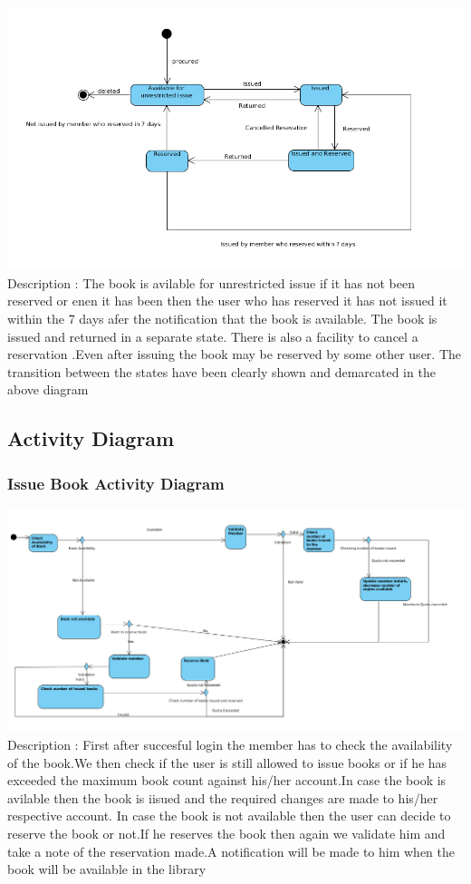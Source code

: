 \documentclass[a4paper]{article}
\begin{document}
\includegraphics[scale=0.50]{images/stateDiagIssue.png}
\\
Description : The book is avilable for unrestricted issue if it has not been reserved or enen it has been then the user who has reserved it has not issued it within the 7 days afer the notification that the book is available. The book is issued and returned in a separate state. There is also a facility to cancel a reservation .Even after issuing the book may be reserved by some other user. The transition between the states have been clearly shown and demarcated in the above diagram


\subsection{Activity Diagram}
\subsubsection*{Issue Book Activity Diagram}
\includegraphics[scale=0.50]{images/activityDiagIssue.png}
\\
Description : First after succesful login the member has to check the availability of the book.We then check if the user is still allowed to issue books or if he has exceeded the maximum book count against his/her account.In case the book is avilable then the book is iisued and the required changes are made to his/her respective account. In case the book is not available then the user can decide to reserve the book or not.If he reserves the book then again we validate him and take a note of the reservation made.A notification will be made to him when the book will be available in the library
\end{document}

